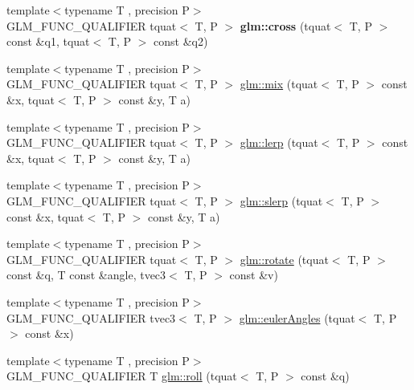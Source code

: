 \begin{DoxyCompactItemize}
\item 
\mbox{\label{gtc_2quaternion_8inl_ae21800a9767f21b7649c196485d924b4}} 
{\footnotesize template$<$typename T , precision P$>$ }\\G\+L\+M\+\_\+\+F\+U\+N\+C\+\_\+\+Q\+U\+A\+L\+I\+F\+I\+ER tquat$<$ T, P $>$ {\bfseries glm\+::cross} (tquat$<$ T, P $>$ const \&q1, tquat$<$ T, P $>$ const \&q2)
\item 
{\footnotesize template$<$typename T , precision P$>$ }\\G\+L\+M\+\_\+\+F\+U\+N\+C\+\_\+\+Q\+U\+A\+L\+I\+F\+I\+ER tquat$<$ T, P $>$ \hyperlink{group__gtc__quaternion_ga31cc82178742c36450f5662bd4fb30b0}{glm\+::mix} (tquat$<$ T, P $>$ const \&x, tquat$<$ T, P $>$ const \&y, T a)
\item 
{\footnotesize template$<$typename T , precision P$>$ }\\G\+L\+M\+\_\+\+F\+U\+N\+C\+\_\+\+Q\+U\+A\+L\+I\+F\+I\+ER tquat$<$ T, P $>$ \hyperlink{group__gtc__quaternion_ga5692804fa4db9e762a1c19b607e54435}{glm\+::lerp} (tquat$<$ T, P $>$ const \&x, tquat$<$ T, P $>$ const \&y, T a)
\item 
{\footnotesize template$<$typename T , precision P$>$ }\\G\+L\+M\+\_\+\+F\+U\+N\+C\+\_\+\+Q\+U\+A\+L\+I\+F\+I\+ER tquat$<$ T, P $>$ \hyperlink{group__gtc__quaternion_ga22b438c7252f3fa5b773c9882471652a}{glm\+::slerp} (tquat$<$ T, P $>$ const \&x, tquat$<$ T, P $>$ const \&y, T a)
\item 
{\footnotesize template$<$typename T , precision P$>$ }\\G\+L\+M\+\_\+\+F\+U\+N\+C\+\_\+\+Q\+U\+A\+L\+I\+F\+I\+ER tquat$<$ T, P $>$ \hyperlink{group__gtc__quaternion_gaa8f42979c921e450ff2812fb43c25702}{glm\+::rotate} (tquat$<$ T, P $>$ const \&q, T const \&angle, tvec3$<$ T, P $>$ const \&v)
\item 
{\footnotesize template$<$typename T , precision P$>$ }\\G\+L\+M\+\_\+\+F\+U\+N\+C\+\_\+\+Q\+U\+A\+L\+I\+F\+I\+ER tvec3$<$ T, P $>$ \hyperlink{group__gtc__quaternion_gadb92ec1c1b0dd6b024176a73fbef3e64}{glm\+::euler\+Angles} (tquat$<$ T, P $>$ const \&x)
\item 
{\footnotesize template$<$typename T , precision P$>$ }\\G\+L\+M\+\_\+\+F\+U\+N\+C\+\_\+\+Q\+U\+A\+L\+I\+F\+I\+ER T \hyperlink{group__gtc__quaternion_ga4fd705376c6c1fd667be0055a0ea58ec}{glm\+::roll} (tquat$<$ T, P $>$ const \&q)
\item 

\end{DoxyCompactItemize}

